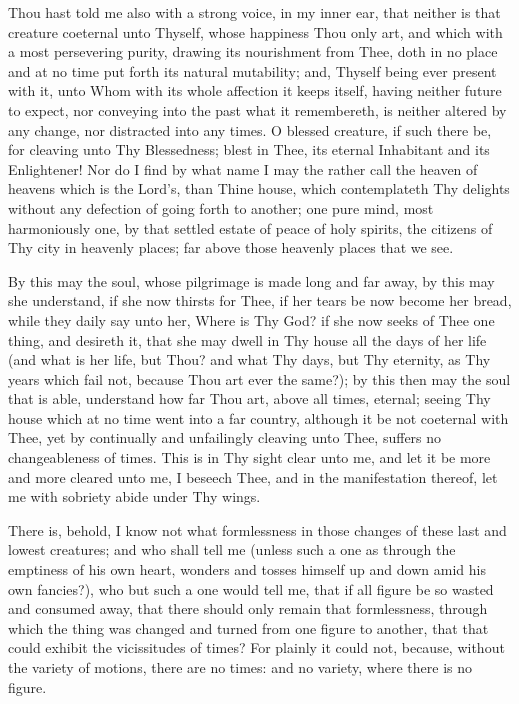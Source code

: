 \documentclass[b5paper,openright,12pt,twoside]{book}
\begin{document}
Thou hast told me also with a strong voice, in my inner ear, that
neither is that creature coeternal unto Thyself, whose happiness
Thou only art, and which with a most persevering purity, drawing its
nourishment from Thee, doth in no place and at no time put forth its
natural mutability; and, Thyself being ever present with it, unto Whom
with its whole affection it keeps itself, having neither future to
expect, nor conveying into the past what it remembereth, is neither
altered by any change, nor distracted into any times. O blessed
creature, if such there be, for cleaving unto Thy Blessedness; blest in
Thee, its eternal Inhabitant and its Enlightener! Nor do I find by what
name I may the rather call the heaven of heavens which is the Lord's,
than Thine house, which contemplateth Thy delights without any defection
of going forth to another; one pure mind, most harmoniously one, by that
settled estate of peace of holy spirits, the citizens of Thy city in
heavenly places; far above those heavenly places that we see.

By this may the soul, whose pilgrimage is made long and far away, by
this may she understand, if she now thirsts for Thee, if her tears be
now become her bread, while they daily say unto her, Where is Thy God?
if she now seeks of Thee one thing, and desireth it, that she may dwell
in Thy house all the days of her life (and what is her life, but Thou?
and what Thy days, but Thy eternity, as Thy years which fail not,
because Thou art ever the same?); by this then may the soul that is
able, understand how far Thou art, above all times, eternal; seeing
Thy house which at no time went into a far country, although it be not
coeternal with Thee, yet by continually and unfailingly cleaving unto
Thee, suffers no changeableness of times. This is in Thy sight clear
unto me, and let it be more and more cleared unto me, I beseech Thee,
and in the manifestation thereof, let me with sobriety abide under Thy
wings.

There is, behold, I know not what formlessness in those changes of these
last and lowest creatures; and who shall tell me (unless such a one as
through the emptiness of his own heart, wonders and tosses himself up
and down amid his own fancies?), who but such a one would tell me, that
if all figure be so wasted and consumed away, that there should only
remain that formlessness, through which the thing was changed and turned
from one figure to another, that that could exhibit the vicissitudes
of times? For plainly it could not, because, without the variety of
motions, there are no times: and no variety, where there is no figure.
\end{document}
